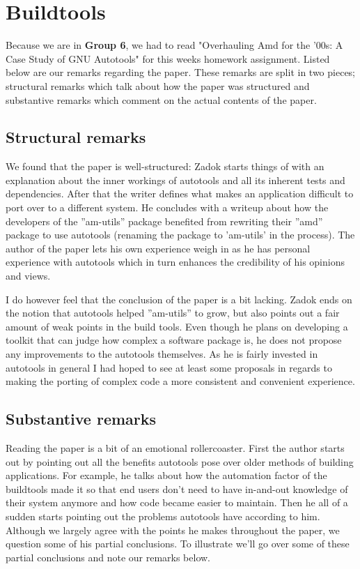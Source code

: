 
\section{Buildtools}
Because we are in \textbf{Group 6}, we had to read "Overhauling Amd for the '00s: A Case Study of GNU Autotools" for this weeks homework assignment. Listed below are our remarks regarding the paper. These remarks are split in two pieces; structural remarks which talk about how the paper was structured and substantive remarks which comment on the actual contents of the paper. 

\subsection{Structural remarks}
We found that the paper is well-structured: Zadok starts things of with an explanation about the inner workings of autotools and all its inherent tests and dependencies. After that the writer defines what makes an application difficult to port over to a different system. He concludes with a writeup about how the developers of the ''am-utils'' package benefited from rewriting their ''amd'' package to use autotools (renaming the package to 'am-utils' in the process). The author of the paper lets his own experience weigh in as he has personal experience with autotools which in turn enhances the credibility of his opinions and views.

I do however feel that the conclusion of the paper is a bit lacking. Zadok ends on the notion that autotools helped ''am-utils'' to grow, but also points out a fair amount of weak points in the build tools. Even though he plans on developing a toolkit that can judge how complex a software package is, he does not propose any improvements to the autotools themselves. As he is fairly invested in autotools in general I had hoped to see at least some proposals in regards to making the porting of complex code a more consistent and convenient experience. 

\subsection{Substantive remarks}
Reading the paper is a bit of an emotional rollercoaster. First the author starts out by pointing out all the benefits autotools pose over older methods of building applications. For example, he talks about how the automation factor of the buildtools made it so that end users don't need to have in-and-out knowledge of their system anymore and how code became easier to maintain. Then he all of a sudden starts pointing out the problems autotools have according to him. Although we largely agree with the points he makes throughout the paper, we question some of his partial conclusions. To illustrate we'll go over some of these partial conclusions and note our remarks below. 

